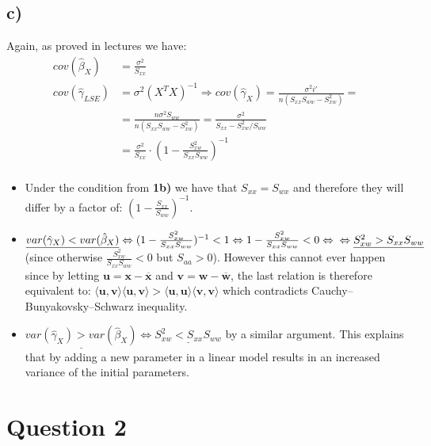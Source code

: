 \documentclass[a4paper]{article}
\begin{document}
\subsection*{c)}
Again, as proved in lectures we have:
\begin{equation*}
\begin{split}
	cov(\hat{\beta}_{X}) & = \frac{\sigma^2}{S_{xx}}\\
	cov(\hat{\gamma}_{LSE}) & = \sigma^2(X^TX)^{-1} \Rightarrow cov(\hat{\gamma}_{X}) = \frac{\sigma^2i'}{n(S_{xx}S_{ww}-S_{xw}^2)} = \\
	& = \frac{n\sigma^2S_{ww}}{n(S_{xx}S_{ww}-S_{xw}^2)} = \frac{\sigma^2}{S_{xx}-{S_{xw}^2}/{S_{ww}}} \\
	& = \frac{\sigma^2}{S_{xx}} \cdot (1-\frac{S_{xw}^2}{S_{xx}S_{ww}})^{-1} \\
\end{split}
\end{equation*}
\begin{itemize}
	\item Under the condition from \textbf{1b)} we have that $S_{xx}=S_{wx}$ and therefore they will differ by a factor of: $(1-\frac{S_{xx}}{S_{ww}})^{-1}$.
	\item $\underline{var(\hat{\gamma}_{X})<var(\hat{\beta}_{X})} \Leftrightarrow (1-\frac{S_{xw}^2}{S_{xx}S_{ww}})^{-1}<1 \Leftrightarrow 1-\frac{S_{xw}^2}{S_{xx}S_{ww}} < 0 \Leftrightarrow \\ \Leftrightarrow \underline{S_{xw}^2>S_{xx}S_{ww}}$ (since otherwise $\frac{S_{xw}^2}{S_{xx}S_{ww}}<0$ but $S_{aa}>0$). However this cannot ever happen since by letting $\textbf{u}=\textbf{x}-\overline{\textbf{x}}$ and $\textbf{v}=\textbf{w}-\overline{\textbf{w}}$, the last relation is therefore equivalent to: $\langle\textbf{u}, \textbf{v}\rangle\langle\textbf{u}, \textbf{v}\rangle > \langle\textbf{u}, \textbf{u}\rangle\langle\textbf{v}, \textbf{v}\rangle$ which contradicts Cauchy–Bunyakovsky–Schwarz inequality.
	\item $\underline{var(\hat{\gamma}_{X})>var(\hat{\beta}_{X})} \Leftrightarrow \underline{S_{xw}^2<S_{xx}S_{ww}}$ by a similar argument. This explains that by adding a new parameter in a linear model results in an increased variance of the initial parameters.
\end{itemize}

\newpage
\section*{Question 2}
\end{document}

